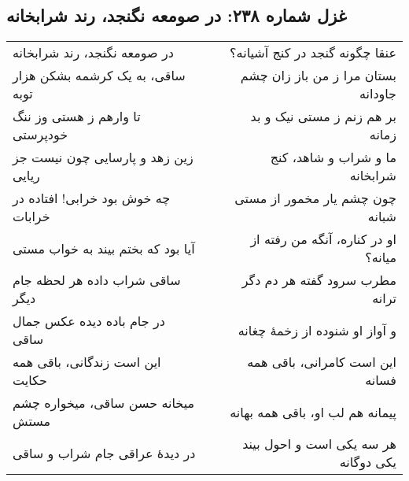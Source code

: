 \begin{center}
\section*{غزل شماره ۲۳۸: در صومعه نگنجد، رند شرابخانه}
\label{sec:238}
\begin{longtable}{l p{0.5cm} r}
در صومعه نگنجد، رند شرابخانه
&&
عنقا چگونه گنجد در کنج آشیانه؟
\\
ساقی، به یک کرشمه بشکن هزار توبه
&&
بستان مرا ز من باز زان چشم جاودانه
\\
تا وارهم ز هستی وز ننگ خودپرستی
&&
بر هم زنم ز مستی نیک و بد زمانه
\\
زین زهد و پارسایی چون نیست جز ریایی
&&
ما و شراب و شاهد، کنج شرابخانه
\\
چه خوش بود خرابی! افتاده در خرابات
&&
چون چشم یار مخمور از مستی شبانه
\\
آیا بود که بختم بیند به خواب مستی
&&
او در کناره، آنگه من رفته از میانه؟
\\
ساقی شراب داده هر لحظه جام دیگر
&&
مطرب سرود گفته هر دم دگر ترانه
\\
در جام باده دیده عکس جمال ساقی
&&
و آواز او شنوده از زخمهٔ چغانه
\\
این است زندگانی، باقی همه حکایت
&&
این است کامرانی، باقی همه فسانه
\\
میخانه حسن ساقی، میخواره چشم مستش
&&
پیمانه هم لب او، باقی همه بهانه
\\
در دیدهٔ عراقی جام شراب و ساقی
&&
هر سه یکی است و احول بیند یکی دوگانه
\\
\end{longtable}
\end{center}
